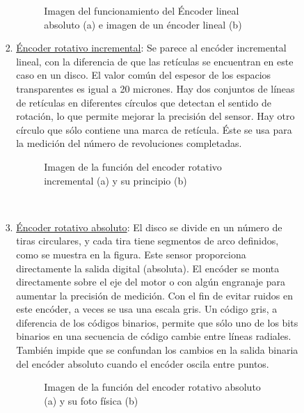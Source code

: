 \begin{enumerate}
\begin{enumerate}
\begin{enumerate}
\begin{enumerate}
\begin{figure}[h]
{					}
					\caption{Imagen del funcionamiento del Éncoder lineal absoluto (a) e imagen de un éncoder lineal (b)}
					\label{fig:Encoders lineales}
				\end{figure}
				
				\item \underline{Éncoder rotativo incremental}: Se parece al encóder incremental lineal, con la diferencia
				de que las retículas se encuentran en este caso en un disco. El valor común del espesor de los espacios transparentes es igual a 20 micrones. Hay dos conjuntos de líneas de retículas en diferentes círculos que detectan el sentido de rotación, lo que permite mejorar la precisión del sensor. Hay otro círculo que sólo contiene una marca de retícula. Éste se usa para la medición del número
				de revoluciones completadas.\cite{saha2010robotics}
				\\
				\begin{figure}[h]
	\centering
	\hfill
	\caption{Imagen de la función del encoder rotativo incremental (a) y su principio (b)}
	\label{fig:Encoders}
\end{figure}				
\\
				\item \underline{Éncoder rotativo absoluto}: El disco se divide en un número de tiras circulares, y cada tira tiene segmentos de arco definidos, como se muestra en la figura. Este sensor proporciona directamente la salida digital (absoluta). El encóder se monta directamente sobre el eje del motor o con algún engranaje para aumentar la precisión de medición. Con el fin de evitar ruidos en este encóder, a veces se usa una escala gris. Un código gris, a diferencia de los códigos binarios, permite que sólo uno de los bits binarios en una secuencia de código cambie entre líneas radiales. También impide que se confundan los cambios en la salida binaria del encóder absoluto cuando el encóder oscila entre puntos. \cite {saha2010robotics}
				\\
				\begin{figure}[h]
					\centering
					\hfill
					\caption{Imagen de la función del encoder rotativo absoluto (a) y su foto física (b)}
					\label{fig:mascotas}
				\end{figure}
				\\
				\\
				\\
			\end{enumerate}
			     

\end{enumerate}
\end{enumerate}
\end{enumerate}
